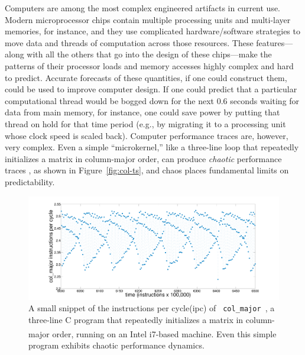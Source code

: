\documentclass{article}
\newcommand{\col}{{\tt col\_major}~}
\begin{document}
Computers are among the most complex engineered artifacts in current
use.  Modern microprocessor chips contain multiple processing units
and multi-layer memories, for instance, and they use complicated
hardware/software strategies to move data and threads of computation
across those resources.  These features---along with all the others
that go into the design of these chips---make the patterns of their
processor loads and memory accesses highly complex and hard to
predict.  Accurate forecasts of these quantities, if one could
construct them, could be used to improve computer design.  If one
could predict that a particular computational thread would be bogged
down for the next 0.6 seconds waiting for data from main memory, for
instance, one could save power by putting that thread on hold for that
time period (e.g., by migrating it to a processing unit whose clock
speed is scaled back).  Computer performance traces are, however, very
complex.  Even a simple ``microkernel,'' like a three-line loop that
repeatedly initializes a matrix in column-major order, can produce
{\sl chaotic} performance traces \cite{mytkowicz09}, as shown in
Figure~\ref{fig:col-ts}, and chaos places fundamental limits on
predictability.
%
 \begin{figure}[htbp]
    \centering
    \includegraphics[width=\textwidth]{figs/colshortts}
    \caption{A small snippet of the instructions per cycle(ipc) of {\tt
        \col}, a three-line C program that repeatedly initializes
      a matrix in column-major order, running on an Intel i7\textsuperscript{\textregistered}-based machine.  Even this
      simple program exhibits chaotic performance dynamics.}
   \label{fig:ipc}
  \end{figure}
\end{document}
